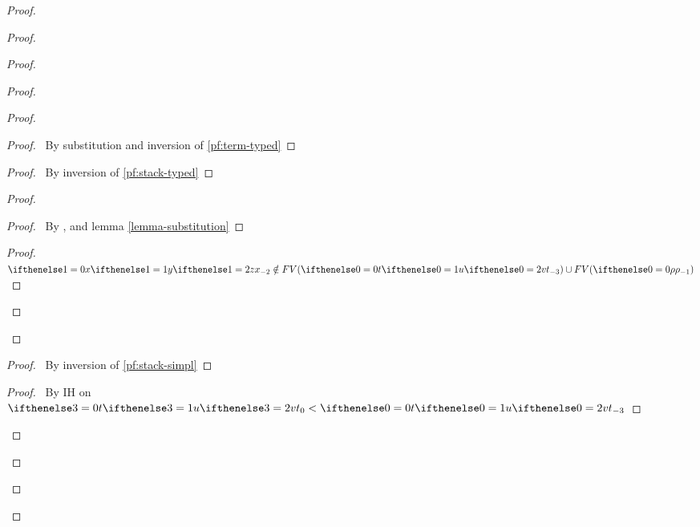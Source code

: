 \documentclass[a4paper]{article}
\begin{document}
\begin{proof}
\begin{proof}
\begin{proof}
\begin{proof}
        \begin{proof}
          \begin{proof}
            \pf\ By substitution and inversion of \ref{pf:term-typed}
          \end{proof}
          \begin{proof}
            \pf\ By inversion of \ref{pf:stack-typed}
          \end{proof}
          \begin{proof}
            \begin{proof}
              \pf\ By ,  and lemma \ref{lemma-substitution}
            \end{proof}
            \qedstep
            \begin{proof}
              \pf\ $\aVar[1] \notin FV(\aTerm) \cup FV(\env)$
            \end{proof}
          \end{proof}
        \end{proof}
        \begin{proof}
          \pf\ By inversion of \ref{pf:stack-simpl}
        \end{proof}
        \qedstep
        \begin{proof}
          \pf\ By IH on $\aTerm[3] < \aTerm$
        \end{proof}
      \end{proof}

\end{proof}
\end{proof}
\end{proof}
\end{document}
